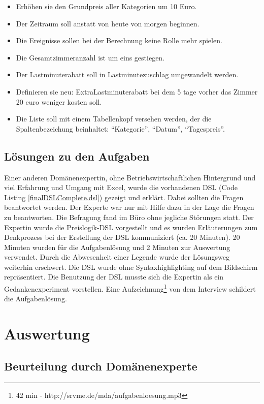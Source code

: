 \documentclass[11pt,english,ngerman, headsepline]{scrreprt}
\begin{document}
\begin{itemize} 
\item Erhöhen sie den Grundpreis aller Kategorien um 10 Euro. 
\item Der Zeitraum soll anstatt von heute von morgen beginnen.
\item Die Ereignisse sollen bei der Berechnung keine Rolle mehr spielen.
\item Die Gesamtzimmeranzahl ist um eins gestiegen.
\item Der Lastminuterabatt soll in Lastminutezuschlag umgewandelt werden.
\item Definieren sie neu: ExtraLastminuterabatt bei dem 5 tage vorher
das Zimmer 20 euro weniger kosten soll. 
\item Die Liste soll mit einem Tabellenkopf versehen werden, der die
Spaltenbezeichung beinhaltet: ``Kategorie'', ``Datum'', ``Tagespreis''. 
\end{itemize}

\section{Lösungen zu den Aufgaben}

Einer anderen Domänenexpertin, ohne Betriebswirtschaftlichen Hintergrund und
viel Erfahrung und Umgang mit Excel, wurde die vorhandenen DSL (Code Listing
\ref{finalDSLComplete.dsl}) gezeigt und erklärt.
Dabei sollten die Fragen beantwortet werden. Der Experte war nur mit Hilfe dazu
in der Lage die Fragen zu beantworten.
Die Befragung fand im Büro ohne jegliche Störungen statt. Der Expertin wurde die
Preislogik-DSL vorgestellt und es wurden Erläuterungen zum Denkprozess bei der
Erstellung der DSL kommuniziert (ca. 20 Minuten). 20 Minuten wurden für die
Aufgabenlösung und 2 Minuten zur Auswertung verwendet. Durch die Abwesenheit
einer Legende wurde der Lösungsweg weiterhin erschwert. Die DSL wurde ohne
Syntaxhighlighting auf dem Bildschirm repräsentiert. Die Benutzung
der DSL musste sich die Expertin als ein Gedankenexperiment
vorstellen.
Eine Aufzeichnung\footnote{42 min - http://srvme.de/mda/aufgabenloesung.mp3} von dem Interview schildert die Aufgabenlösung.


  
\chapter{Auswertung}
  

\section{Beurteilung durch Domänenexperte}\label{reaktionExperte}
\end{document}
